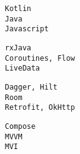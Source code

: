 \documentclass[9pt]{developercv} %
\begin{document}
\begin{minipage}[t]{0.28\linewidth}
	\vspace{-\baselineskip} %
	\texttt{Kotlin}\\
	\texttt{Java}\\
	\texttt{Javascript}\\
\end{minipage}
\hfill
\begin{minipage}[t]{0.28\textwidth}
	\vspace{-\baselineskip} %
		
	\texttt{rxJava}\\
	\texttt{Coroutines, Flow}\\
	\texttt{LiveData}\\
	
\end{minipage}
\hfill
\begin{minipage}[t]{0.28\linewidth}
	\vspace{-\baselineskip} %
		
	\texttt{Dagger, Hilt}\\
	\texttt{Room}\\
	\texttt{Retrofit, OkHttp}\\
\end{minipage}
\hfill
\begin{minipage}[t]{0.08\textwidth}
	\vspace{-\baselineskip} %
		
	\texttt{Compose}\\
	\texttt{MVVM}\\
	\texttt{MVI}\\
\end{minipage}



\end{document}
